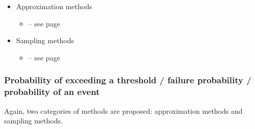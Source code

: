 \begin{itemize}

\item Approximation methods
  \begin{itemize}
  \item {}  -- see page \pageref{docref_C211_QuadraticCumul} \vspace{2mm}
  \end{itemize}

\item Sampling methods
  \begin{itemize}
  \item {}  -- see page \pageref{docref_C221_MonteCarloStd} \vspace{2mm}
  \end{itemize}

\end{itemize}

\subsubsection{Probability of exceeding a threshold / failure probability / probability of an event}

Again, two categories of methods are proposed: approximation methods and sampling methods.

